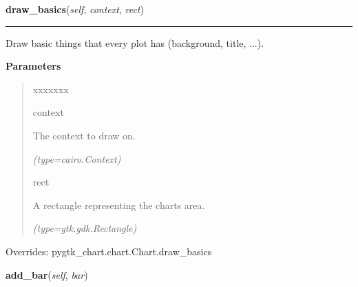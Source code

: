 \hspace{.8\funcindent}\begin{boxedminipage}{\funcwidth}

    \raggedright \textbf{draw\_basics}(\textit{self}, \textit{context}, \textit{rect})

    \vspace{-1.5ex}

    \rule{\textwidth}{0.5\fboxrule}
\setlength{\parskip}{2ex}
    Draw basic things that every plot has (background, title, ...).

\setlength{\parskip}{1ex}
      \textbf{Parameters}
      \vspace{-1ex}

      \begin{quote}
        \begin{Ventry}{xxxxxxx}

          \item[context]

          The context to draw on.

            {\it (type=cairo.Context)}

          \item[rect]

          A rectangle representing the charts area.

            {\it (type=gtk.gdk.Rectangle)}

        \end{Ventry}

      \end{quote}

      Overrides: pygtk\_chart.chart.Chart.draw\_basics

    \end{boxedminipage}

    \label{pygtk_chart:bar_chart:BarChart:add_bar}

    \vspace{0.5ex}

\hspace{.8\funcindent}\begin{boxedminipage}{\funcwidth}

    \raggedright \textbf{add\_bar}(\textit{self}, \textit{bar})

\setlength{\parskip}{2ex}
\setlength{\parskip}{1ex}
    \end{boxedminipage}

